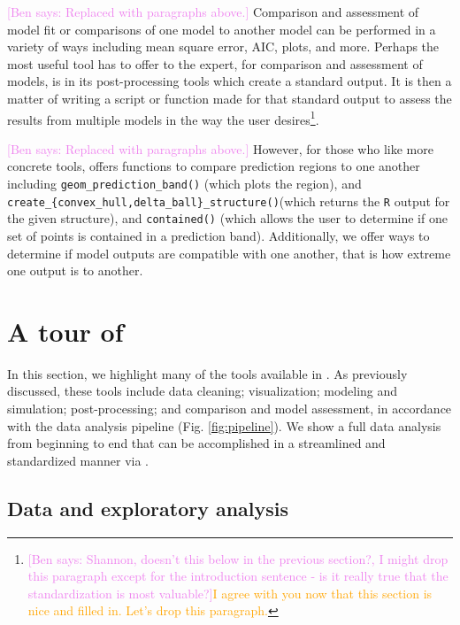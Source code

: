 \documentclass[
  shortnames]{jss}
\begin{document}
\textcolor{violet}{[Ben says: Replaced with paragraphs above.]}
Comparison and assessment of model fit or comparisons of one model to
another model can be performed in a variety of ways including mean
square error, AIC, plots, and more. Perhaps the most useful tool
 has to offer to the expert, for comparison and
assessment of models, is in its post-processing tools which create a
standard output. It is then a matter of writing a script or function
made for that standard output to assess the results from multiple models
in the way the user
desires\footnote{\textcolor{violet}{[Ben says: Shannon, doesn't this below in the previous section?, I might drop this paragraph except for the introduction sentence - is it really true that the standardization is most valuable?]}\textcolor{orange}{I agree with you now that this section is nice and filled in.  Let's drop this paragraph.}}.

\textcolor{violet}{[Ben says: Replaced with paragraphs above.]} However,
for those who like more concrete tools,  offers
functions to compare prediction regions to one another including
\texttt{geom\_prediction\_band()} (which plots the region), and
\texttt{create\_\{convex\_hull,delta\_ball\}\_structure()}(which returns
the \texttt{R} output for the given structure), and \texttt{contained()}
(which allows the user to determine if one set of points is contained in
a prediction band). Additionally, we offer ways to determine if model
outputs are compatible with one another, that is how extreme one output
is to another.

\section[Tour]{A tour of }\label{sec:tour}

In this section, we highlight many of the tools available in
. As previously discussed, these tools include data
cleaning; visualization; modeling and simulation; post-processing; and
comparison and model assessment, in accordance with the data analysis
pipeline (Fig. \ref{fig:pipeline}). We show a full data analysis from
beginning to end that can be accomplished in a streamlined and
standardized manner via .

\subsection{Data and exploratory analysis}
\end{document}
